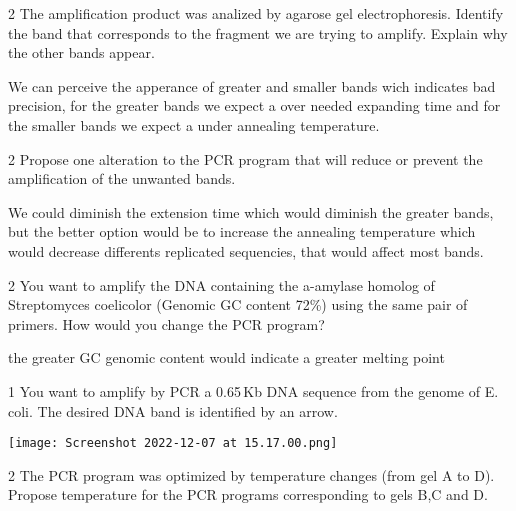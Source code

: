 \documentclass[\mainfilename]{subfiles}
\begin{document}
\begin{questionBox}2{ %
    The amplification product was analized by agarose gel electrophoresis. Identify the band that corresponds to the fragment we are trying to amplify. Explain why the other bands appear.
} %

    We can perceive the apperance of greater and smaller bands wich indicates bad precision, for the greater bands we expect a over needed expanding time and for the smaller bands we expect a under annealing temperature.



\end{questionBox}

\begin{questionBox}2{ %
    Propose one alteration to the PCR program that will reduce or prevent the amplification of the unwanted bands.
} %

    We could diminish the extension time which would diminish the greater bands, but the better option would be to increase the annealing temperature which would decrease differents replicated sequencies, that would affect most bands.
    
\end{questionBox}

\begin{questionBox}2{ %
    You want to amplify the DNA containing the a-amylase homolog of Streptomyces coelicolor (Genomic GC content 72\%) using the same pair of primers. How would you change the PCR program?
} %

    the greater GC genomic content would indicate a greater melting point


\end{questionBox}

\begin{questionBox}1{ %
    You want to amplify by PCR a 0.65\,Kb DNA sequence from the genome of E. coli. The desired DNA band is identified by an arrow.
} %
    \begin{center}
        \texttt{[image: Screenshot 2022-12-07 at 15.17.00.png]}
    \end{center}
\end{questionBox}


\begin{questionBox}2{ %
    The PCR program was optimized by temperature changes (from gel A to D). Propose temperature for the PCR programs corresponding to gels B,C and D.
} %
\end{questionBox}
\end{document}
